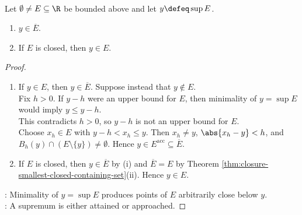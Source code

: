 \begin{theorem} \label{thm:supremum-belongs-to-closure} \\
Let $\emptyset\neq E\subseteq\R$ be bounded above and let $y\defeq\sup E$.
\begin{enumerate}[label=(\roman*)]
\setlength{\itemsep}{0pt}
\item $y\in\overline{E}$.
\item If $E$ is closed, then $y\in E$.
\end{enumerate}
\begin{proof}
\begin{enumerate}[label=(\roman*)]
\setlength{\itemsep}{0pt}
\item If $y\in E$, then $y\in\overline{E}$. Suppose instead that $y\notin E$.\\
Fix $h>0$. If $y-h$ were an upper bound for $E$, then minimality of $y=\sup E$ would imply $y\leq y-h$.\\
This contradicts $h>0$, so $y-h$ is not an upper bound for $E$.\\
Choose $x_h\in E$ with $y-h<x_h\leq y$. Then $x_h\neq y$, $\abs{x_h-y}<h$, and $B_h(y)\cap(E\setminus\{y\})\neq\emptyset$. Hence $y\in E^{\operatorname{acc}}\subseteq\overline{E}$.
\item If $E$ is closed, then $y\in\overline{E}$ by (i) and $\overline{E}=E$ by Theorem \ref{thm:closure-smallest-closed-containing-set}(ii). Hence $y\in E$.
\end{enumerate}
: Minimality of $y=\sup E$ produces points of $E$ arbitrarily close below $y$.\\
: A supremum is either attained or approached.
\end{proof}
\end{theorem}
